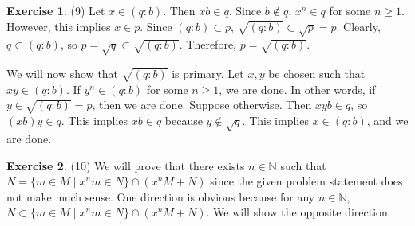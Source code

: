 \documentclass[12pt, psamsfonts]{amsart}
\theoremstyle{definition}
\newtheorem*{exer}{Exercise}
\theoremstyle{remark}
\numberwithin{equation}{section}
\begin{document}
\begin{exer}{(9)}
  Let $x \in (q:b)$.
  Then $xb \in q$.
  Since $b \notin q$, $x^n \in q$ for some $n \geq 1$.
  However, this implies $x \in p$.
  Since $(q:b) \subset p$, $\sqrt{(q:b)} \subset \sqrt{p} = p$.
  Clearly, $q \subset (q:b)$, so $p = \sqrt{q} \subset \sqrt{(q:b)}$.
  Therefore, $p = \sqrt{(q:b)}$.

  We will now show that $\sqrt{(q:b)}$ is primary.
  Let $x, y$ be chosen such that $xy \in (q:b)$.
  If $y^n \in (q:b)$ for some $n \geq 1$, we are done.
  In other words, if $y \in \sqrt{(q:b)} = p$, then we are done.
  Suppose otherwise.
  Then $xyb \in q$, so $(xb)y \in q$.
  This implies $xb \in q$ because $y \notin \sqrt{q}$.
  This implies $x \in (q:b)$, and we are done.
\end{exer}

\begin{exer}{(10)}
  We will prove that there exists $n \in \mathbb{N}$ such that $N = \{ m \in M \mid x^nm \in N \} \cap (x^nM + N)$ since the given problem statement does not make much sense.
  One direction is obvious because for any $n \in \mathbb{N}$, $N \subset \{ m \in M \mid x^nm \in N \} \cap (x^nM + N)$.
  We will show the opposite direction.
\end{exer}
\end{document}
